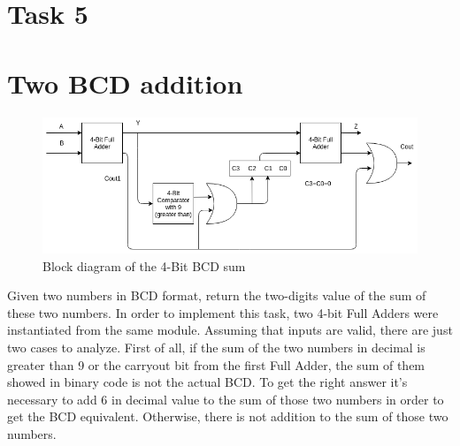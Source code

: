 

\section*{Task 5}




\section{Two BCD addition}

\begin{figure}[H]
  \begin{centering}
  \includegraphics[scale=0.5]{data/ej5.png}
  \par\end{centering}
  \caption{Block diagram of the 4-Bit BCD sum}
\end{figure}
Given two numbers in BCD format, return the two-digits value of the sum of these two numbers.
In order to implement this task, two 4-bit Full Adders were instantiated from the same module.
Assuming that inputs are valid, there are just two cases to analyze. 
First of all, if the sum of the two numbers in decimal is greater than 9 or the carryout bit from the first Full Adder, the sum of them showed in binary code is not the actual BCD.   
To get the right answer it's necessary to add 6 in decimal value to the sum of those two numbers in order to get the BCD equivalent. Otherwise, there is not addition to the sum of those two numbers.



